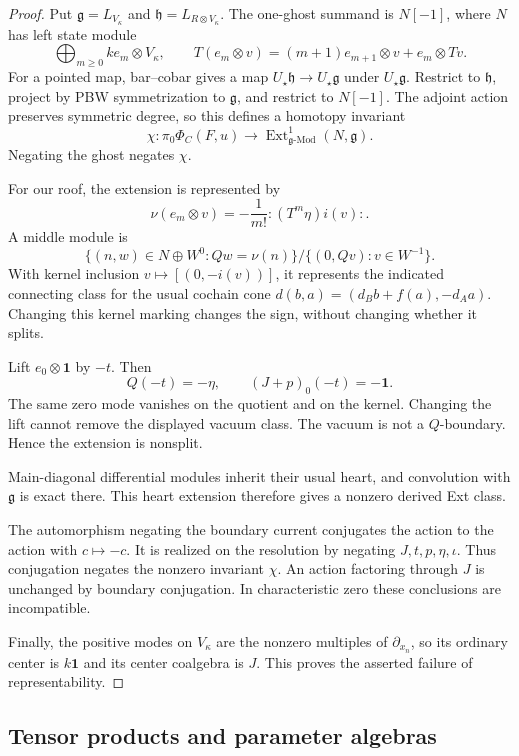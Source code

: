 \begin{proof}
Put $\mathfrak g=L_{V_\kappa}$ and
$\mathfrak h=L_{R\otimes V_\kappa}$. The one-ghost summand
is $N[-1]$, where $N$ has left state module
\[
 \bigoplus_{m\geq0}ke_m\otimes V_\kappa,\qquad
 T(e_m\otimes v)=(m+1)e_{m+1}\otimes v+e_m\otimes Tv.
\]
For a pointed map, bar--cobar gives a map
$U_\star\mathfrak h\to U_\star\mathfrak g$
under $U_\star\mathfrak g$.
Restrict to $\mathfrak h$, project by PBW symmetrization
to $\mathfrak g$, and restrict to $N[-1]$.
The adjoint action preserves symmetric degree, so this
defines a homotopy invariant
\[
 \chi:\pi_0\Phi_C(F,u)\longrightarrow
 \operatorname{Ext}^1_{\mathfrak g\text{-}\mathrm{Mod}}
 (N,\mathfrak g).
\]
Negating the ghost negates $\chi$.

For our roof, the extension is represented by
\[
 \nu(e_m\otimes v)=-\frac1{m!}:(T^m\eta)i(v):.
\]
A middle module is
\[
 \{(n,w)\in N\oplus W^0:Qw=\nu(n)\}
/\{(0,Qv):v\in W^{-1}\}.
\]
With kernel inclusion $v\mapsto[(0,-i(v))]$, it represents
the indicated connecting class for the usual cochain cone
$d(b,a)=(d_Bb+f(a),-d_Aa)$.
Changing this kernel marking changes the sign, without
changing whether it splits.

Lift $e_0\otimes\mathbf1$ by $-t$. Then
\[
 Q(-t)=-\eta,\qquad (J+p)_0(-t)=-\mathbf1.
\]
The same zero mode vanishes on the quotient and on the kernel.
Changing the lift cannot remove the displayed vacuum class.
The vacuum is not a $Q$-boundary. Hence the extension is
nonsplit.

Main-diagonal differential modules inherit their
usual heart, and convolution with $\mathfrak g$ is exact
there. This heart extension therefore gives a nonzero
derived Ext class.

The automorphism negating the boundary current conjugates
the action to the action with $c\mapsto-c$.
It is realized on the resolution by negating
$J,t,p,\eta,\iota$. Thus conjugation negates the nonzero
invariant $\chi$. An action factoring through $J$ is
unchanged by boundary conjugation. In characteristic zero
these conclusions are incompatible.

Finally, the positive modes on $V_\kappa$ are the nonzero
multiples of $\partial_{x_n}$, so its ordinary center is
$k\mathbf1$ and its center coalgebra is $J$.
This proves the asserted failure of representability.
\end{proof}

\subsection{Tensor products and parameter algebras}

